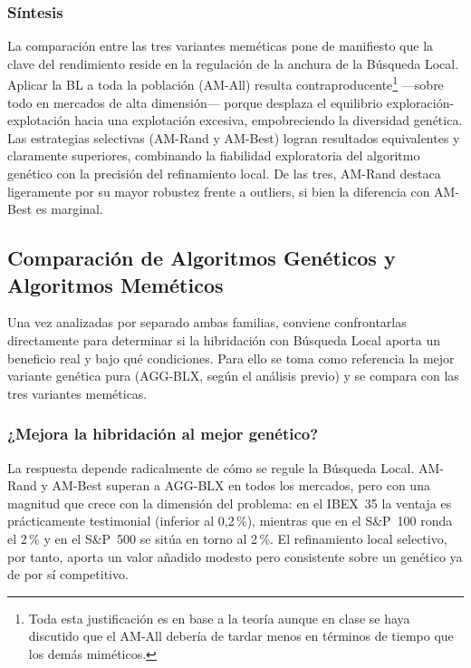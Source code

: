 \subsubsection*{Síntesis}

La comparación entre las tres variantes meméticas pone de manifiesto que la clave del rendimiento reside en la regulación de la anchura de la Búsqueda Local. Aplicar la BL a toda la población (AM-All) resulta contraproducente\footnote{Toda esta justificación es en base a la teoría aunque en clase se haya discutido que el AM-All debería de tardar menos en términos de tiempo que los demás miméticos.} ---sobre todo en mercados de alta dimensión--- porque desplaza el equilibrio exploración-explotación hacia una explotación excesiva, empobreciendo la diversidad genética. Las estrategias selectivas (AM-Rand y AM-Best) logran resultados equivalentes y claramente superiores, combinando la fiabilidad exploratoria del algoritmo genético con la precisión del refinamiento local. De las tres, AM-Rand destaca ligeramente por su mayor robustez frente a outliers, si bien la diferencia con AM-Best es marginal.

\subsection{Comparación de Algoritmos Genéticos y Algoritmos Meméticos}

Una vez analizadas por separado ambas familias, conviene confrontarlas directamente para determinar si la hibridación con Búsqueda Local aporta un beneficio real y bajo qué condiciones. Para ello se toma como referencia la mejor variante genética pura (AGG-BLX, según el análisis previo) y se compara con las tres variantes meméticas.

\subsubsection*{¿Mejora la hibridación al mejor genético?}

La respuesta depende radicalmente de cómo se regule la Búsqueda Local. AM-Rand y AM-Best superan a AGG-BLX en todos los mercados, pero con una magnitud que crece con la dimensión del problema: en el IBEX~35 la ventaja es prácticamente testimonial (inferior al 0,2\,\%), mientras que en el S\&P~100 ronda el 2\,\% y en el S\&P~500 se sitúa en torno al 2\,\%. El refinamiento local selectivo, por tanto, aporta un valor añadido modesto pero consistente sobre un genético ya de por sí competitivo.

